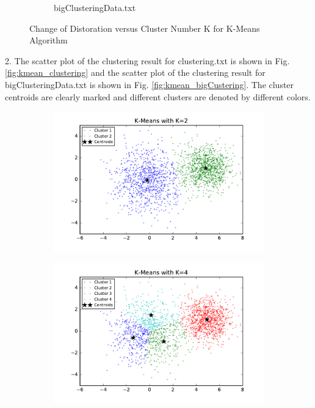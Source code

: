 \begin{description}
\begin{description}
\begin{figure}[H]
\begin{subfigure}[b]{0.49\textwidth}
            \caption{bigClusteringData.txt}\label{fig:1b}
        \end{subfigure}
\caption{Change of Distoration versus Cluster Number K for K-Means Algorithm}
\label{fig:k-means-loss} 
\end{figure}

\item{2.} The scatter plot of the clustering result for clustering.txt is shown in Fig. \ref{fig:kmean_clustering} and the scatter plot of the clustering result for bigClusteringData.txt is shown in Fig. \ref{fig:kmean_bigCustering}. The cluster centroids are clearly marked and different clusters are denoted by different colors. \\

\begin{figure}[!h]
        \centering
        \begin{subfigure}[b]{0.475\textwidth}
            \centering
            \includegraphics[width=\textwidth]{./figures/clustering_kMeans_2.pdf}
        \end{subfigure}
        \hfill
        \begin{subfigure}[b]{0.475\textwidth}  
            \centering 
            \includegraphics[width=\textwidth]{./figures/clustering_kMeans_4.pdf}

\end{subfigure}
\end{figure}
\end{description}
\end{description}

